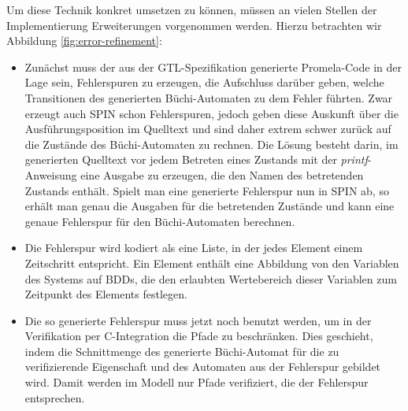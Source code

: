 Um diese Technik konkret umsetzen zu können, müssen an vielen Stellen der Implementierung Erweiterungen vorgenommen werden.
Hierzu betrachten wir Abbildung \ref{fig:error-refinement}:
\begin{itemize}
\item Zunächst muss der aus der GTL-Spezifikation generierte Promela-Code in der Lage sein, Fehlerspuren zu erzeugen, die Aufschluss darüber geben, welche Transitionen des generierten Büchi-Automaten zu dem Fehler führten.
  Zwar erzeugt auch SPIN schon Fehlerspuren, jedoch geben diese Auskunft über die Ausführungsposition im Quelltext und sind daher extrem schwer zurück auf die Zustände des Büchi-Automaten zu rechnen.
  Die Lösung besteht darin, im generierten Quelltext vor jedem Betreten eines Zustands mit der \emph{printf}-Anweisung eine Ausgabe zu erzeugen, die den Namen des betretenden Zustands enthält.
  Spielt man eine generierte Fehlerspur nun in SPIN ab, so erhält man genau die Ausgaben für die betretenden Zustände und kann eine genaue Fehlerspur für den Büchi-Automaten berechnen.
\item Die Fehlerspur wird kodiert als eine Liste, in der jedes Element einem Zeitschritt entspricht.
  Ein Element enthält eine Abbildung von den Variablen des Systems auf BDDs, die den erlaubten Wertebereich dieser Variablen zum Zeitpunkt des Elements festlegen.
\item Die so generierte Fehlerspur muss jetzt noch benutzt werden, um in der Verifikation per C-Integration die Pfade zu beschränken.
  Dies geschieht, indem die Schnittmenge des generierte Büchi-Automat für die zu verifizierende Eigenschaft und des Automaten aus der Fehlerspur gebildet wird.
  Damit werden im Modell nur Pfade verifiziert, die der Fehlerspur entsprechen.
\end{itemize}
